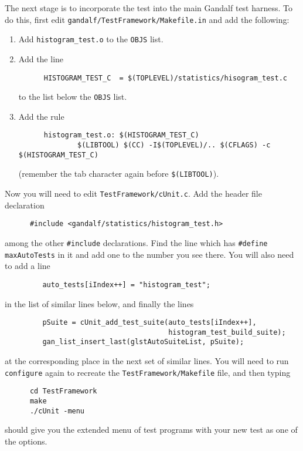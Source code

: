 The next stage is to incorporate the test into the main Gandalf test
harness. To do this, first edit {\tt gandalf/TestFramework/Makefile.in}
and add the following:
\begin{enumerate}
  \item Add {\tt histogram\_test.o} to the {\tt OBJS} list.
  \item Add the line
\begin{verbatim}
      HISTOGRAM_TEST_C  = $(TOPLEVEL)/statistics/hisogram_test.c
\end{verbatim}
	to the list below the {\tt OBJS} list.
  \item Add the rule
\begin{verbatim}
      histogram_test.o: $(HISTOGRAM_TEST_C)
              $(LIBTOOL) $(CC) -I$(TOPLEVEL)/.. $(CFLAGS) -c $(HISTOGRAM_TEST_C)
\end{verbatim}
(remember the tab character again before {\tt \$(LIBTOOL)}).
\end{enumerate}
Now you will need to edit {\tt TestFramework/cUnit.c}. Add the header file
declaration
\begin{verbatim}
      #include <gandalf/statistics/histogram_test.h>
\end{verbatim}
among the other {\tt \#include} declarations. Find the line
which has {\tt \#define maxAutoTests} in it and add one to the number
you see there. You will also need to add a line
\begin{verbatim}
         auto_tests[iIndex++] = "histogram_test";
\end{verbatim}
in the list of similar lines below, and finally the lines
\begin{verbatim}
         pSuite = cUnit_add_test_suite(auto_tests[iIndex++],
                                       histogram_test_build_suite);
         gan_list_insert_last(glstAutoSuiteList, pSuite);
\end{verbatim}
at the corresponding place in the next set of similar lines.
You will need to run {\tt configure} again to recreate the
{\tt TestFramework/Makefile} file, and then typing
\begin{verbatim}
      cd TestFramework
      make
      ./cUnit -menu
\end{verbatim}
should give you the extended menu of test programs with your new test
as one of the options.
